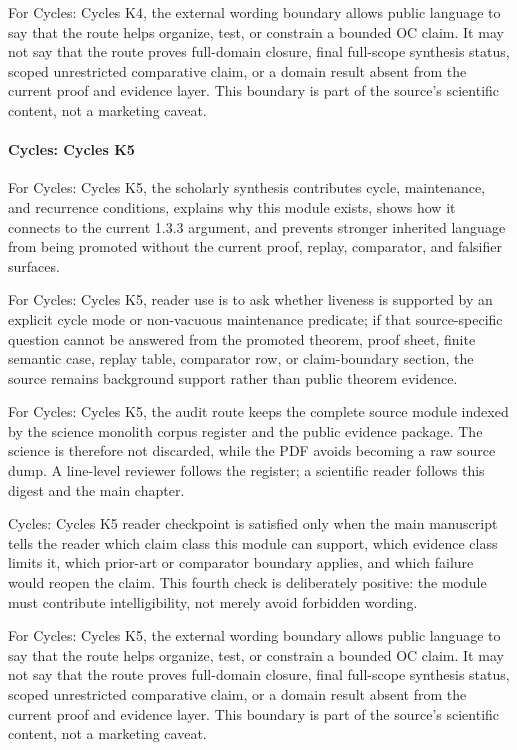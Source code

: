 For Cycles: Cycles K4, the external wording boundary allows public language to say that the route helps organize, test, or constrain a bounded OC claim. It may not say that the route proves full-domain closure, final full-scope synthesis status, scoped unrestricted comparative claim, or a domain result absent from the current proof and evidence layer. This boundary is part of the source's scientific content, not a marketing caveat.


\paragraph{Cycles: Cycles K5}

For Cycles: Cycles K5, the scholarly synthesis contributes cycle, maintenance, and recurrence conditions, explains why this module exists, shows how it connects to the current 1.3.3 argument, and prevents stronger inherited language from being promoted without the current proof, replay, comparator, and falsifier surfaces.


For Cycles: Cycles K5, reader use is to ask whether liveness is supported by an explicit cycle mode or non-vacuous maintenance predicate; if that source-specific question cannot be answered from the promoted theorem, proof sheet, finite semantic case, replay table, comparator row, or claim-boundary section, the source remains background support rather than public theorem evidence.


For Cycles: Cycles K5, the audit route keeps the complete source module indexed by the science monolith corpus register and the public evidence package. The science is therefore not discarded, while the PDF avoids becoming a raw source dump. A line-level reviewer follows the register; a scientific reader follows this digest and the main chapter.


Cycles: Cycles K5 reader checkpoint is satisfied only when the main manuscript tells the reader which claim class this module can support, which evidence class limits it, which prior-art or comparator boundary applies, and which failure would reopen the claim. This fourth check is deliberately positive: the module must contribute intelligibility, not merely avoid forbidden wording.


For Cycles: Cycles K5, the external wording boundary allows public language to say that the route helps organize, test, or constrain a bounded OC claim. It may not say that the route proves full-domain closure, final full-scope synthesis status, scoped unrestricted comparative claim, or a domain result absent from the current proof and evidence layer. This boundary is part of the source's scientific content, not a marketing caveat.


